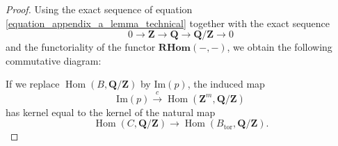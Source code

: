 \documentclass{proc-l}
\newcommand{\Z}{\mathbf{Z}}
\newcommand{\Q}{\mathbf{Q}}
\DeclareMathOperator{\Hom}{Hom}
\DeclareMathOperator{\tor}{tor}
\theoremstyle{definition}
\theoremstyle{remark}
\numberwithin{equation}{section}
\begin{document}
\begin{proof}
Using the exact sequence of equation \ref{equation_appendix_a_lemma_technical} together with the exact sequence
\[
0 \rightarrow \Z \rightarrow \Q \rightarrow \Q/\Z \rightarrow 0
\]
and the functoriality of the functor $\mathbf{RHom}(-,-)$, we obtain the following commutative diagram:

\begin{center}
\end{center}If we replace $\Hom(B,\Q/\Z)$ by $\mathrm{Im}(p)$, the induced map
\[
\mathrm{Im}(p) \xrightarrow{c} \Hom(\Z^m,\Q/\Z)
\]
has kernel equal to the kernel of the natural map
\[
\Hom(C,\Q/\Z) \longrightarrow \Hom(B_{\tor},\Q/\Z).
\]
\end{proof}
\end{document}
